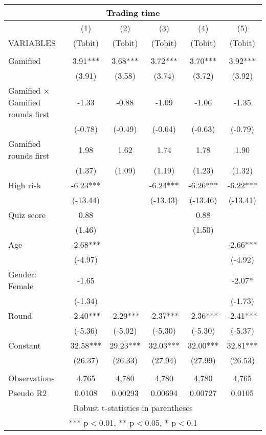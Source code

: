 \documentclass[]{article}
\begin{document}
\begin{tabular}{lccccc}
\multicolumn{6}{c}{Trading time} \\ \hline
 & (1) & (2) & (3) & (4) & (5) \\
VARIABLES & (Tobit) & (Tobit) & (Tobit) & (Tobit) & (Tobit) \\ \hline
 &  &  &  &  &  \\
Gamified & 3.91*** & 3.68*** & 3.72*** & 3.70*** & 3.92*** \\
 & (3.91) & (3.58) & (3.74) & (3.72) & (3.92) \\
Gamified $\times$ Gamified rounds first & -1.33 & -0.88 & -1.09 & -1.06 & -1.35 \\
 & (-0.78) & (-0.49) & (-0.64) & (-0.63) & (-0.79) \\
Gamified rounds first & 1.98 & 1.62 & 1.74 & 1.78 & 1.90 \\
 & (1.37) & (1.09) & (1.19) & (1.23) & (1.32) \\
High risk & -6.23*** &  & -6.24*** & -6.26*** & -6.22*** \\
 & (-13.44) &  & (-13.43) & (-13.46) & (-13.41) \\
Quiz score & 0.88 &  &  & 0.88 &  \\
 & (1.46) &  &  & (1.50) &  \\
Age & -2.68*** &  &  &  & -2.66*** \\
 & (-4.97) &  &  &  & (-4.92) \\
Gender: Female & -1.65 &  &  &  & -2.07* \\
 & (-1.34) &  &  &  & (-1.73) \\
Round & -2.40*** & -2.29*** & -2.37*** & -2.36*** & -2.41*** \\
 & (-5.36) & (-5.02) & (-5.30) & (-5.30) & (-5.37) \\
Constant & 32.58*** & 29.23*** & 32.03*** & 32.00*** & 32.81*** \\
 & (26.37) & (26.33) & (27.94) & (27.99) & (26.53) \\
 &  &  &  &  &  \\
Observations & 4,765 & 4,780 & 4,780 & 4,780 & 4,765 \\
 Pseudo R2 & 0.0108 & 0.00293 & 0.00694 & 0.00727 & 0.0105 \\ \hline
\multicolumn{6}{c}{ Robust t-statistics in parentheses} \\
\multicolumn{6}{c}{ *** p$<$0.01, ** p$<$0.05, * p$<$0.1} \\
\end{tabular}
\end{document}
